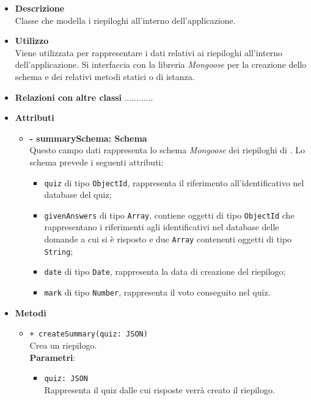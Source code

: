 \begin{itemize}
	\item \textbf{Descrizione} \\
	Classe che modella i riepiloghi all'interno dell'applicazione.
	\item \textbf{Utilizzo} \\
	Viene utilizzata per rappresentare i dati relativi ai riepiloghi all'interno dell'applicazione. Si interfaccia con la libreria \textit{Mongoose} per la creazione dello schema e dei relativi metodi statici o di istanza.
	\item \textbf{Relazioni con altre classi}
		............
	\item \textbf{Attributi}
		\begin{itemize}
			\item \textbf{- summarySchema: Schema} \\
			Questo campo dati rappresenta lo schema \textit{Mongoose} dei riepiloghi di \progetto. Lo schema prevede i seguenti attributi:
				\begin{itemize}
					\item \texttt{quiz} di tipo \texttt{ObjectId}, rappresenta il riferimento all'identificativo nel database del quiz;
					\item \texttt{givenAnswers} di tipo \texttt{Array}, contiene oggetti di tipo \texttt{ObjectId} che rappresentano i riferimenti agli identificativi nel database delle domande a cui si è risposto e due \texttt{Array} contenenti oggetti di tipo \texttt{String};	
					\item \texttt{date} di tipo \texttt{Date}, rappresenta la data di creazione del riepilogo;
					\item \texttt{mark} di tipo \texttt{Number}, rappresenta il voto conseguito nel quiz.
				\end{itemize}
		\end{itemize}
	\item \textbf{Metodi}
		\begin{itemize}
			\item \texttt{+ createSummary(quiz: JSON)}\\
			Crea un riepilogo.\\
			\textbf{Parametri}:
			\begin{itemize}
				\item \texttt{quiz: JSON}\\
				Rappresenta il quiz dalle cui risposte verrà creato il riepilogo.
			\end{itemize}
		\end{itemize}
\end{itemize}